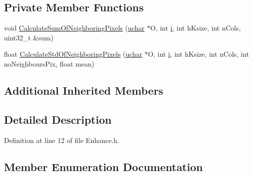 \subsection*{Private Member Functions}
\begin{DoxyCompactItemize}
\item 
void \hyperlink{class_vision_1_1_enhance_a6ff043acf8f40873141ef3bb0af4994d}{Calculate\+Sum\+Of\+Neighboring\+Pixels} (\hyperlink{_soil_math_types_8h_a65f85814a8290f9797005d3b28e7e5fc}{uchar} $\ast$O, int \hyperlink{_v_s_a___u_t_2_comparision_pictures_2_createtest_image_8m_a6f6ccfcf58b31cb6412107d9d5281426}{i}, int h\+Ksize, int n\+Cols, uint32\+\_\+t \&sum)
\item 
float \hyperlink{class_vision_1_1_enhance_ac03740bd6b3cd2936a579644c9646ce0}{Calculate\+Std\+Of\+Neighboring\+Pixels} (\hyperlink{_soil_math_types_8h_a65f85814a8290f9797005d3b28e7e5fc}{uchar} $\ast$O, int \hyperlink{_v_s_a___u_t_2_comparision_pictures_2_createtest_image_8m_a6f6ccfcf58b31cb6412107d9d5281426}{i}, int h\+Ksize, int n\+Cols, int no\+Neighbours\+Pix, float mean)
\end{DoxyCompactItemize}
\subsection*{Additional Inherited Members}


\subsection{Detailed Description}


Definition at line 12 of file Enhance.\+h.



\subsection{Member Enumeration Documentation}
\hypertarget{class_vision_1_1_enhance_a36caf2ddf5cb2575bfae8bcdca04e58e}{}

